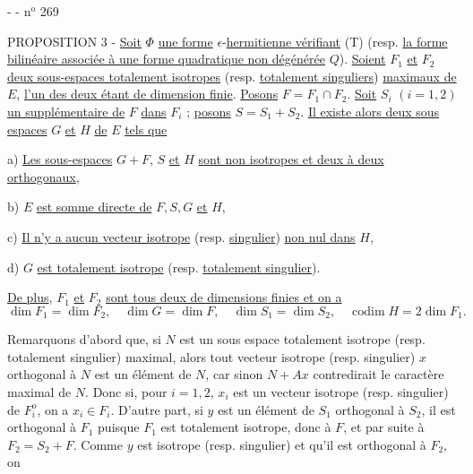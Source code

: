 -  - \hfill n$^{\mathrm{o}}$ 269

PROPOSITION 3 - \uline{Soit} $\Phi$ \uline{une forme} $\epsilon$-\uline{hermitienne vérifiant} (T) (resp. \uline{la forme bilinéaire associée à une forme quadratique non dégénérée} $Q$). \uline{Soient} $F_1$ \uline{et} $F_2$ \uline{deux sous-espaces totalement isotropes} (resp. \uline{totalement singuliers}) \uline{maximaux de} $E$, \uline{l'un des deux étant de dimension finie}. \uline{Posons} $F=F_1\cap F_2$. \uline{Soit} $S_i$ $(i=1,2)$ \uline{un supplémentaire de} $F$ \uline{dans} $F_i$ ; \uline{posons} $S=S_1+S_2$. \uline{Il existe alors deux sous espaces} $G$ \uline{et} $H$ \uline{de} $E$ \uline{tels que}

a) \uline{Les sous-espaces} $G+F$, $S$ \uline{et} $H$ \uline{sont non isotropes et deux à deux orthogonaux},

b) $E$ \uline{est somme directe de} $F,S,G$ \uline{et} $H$,

c) \uline{Il n'y a aucun vecteur isotrope} (resp. \uline{singulier}) \uline{non nul dans} $H$,

d) $G$ \uline{est totalement isotrope} (resp. \uline{totalement singulier}).

\uline{De plus}, $F_1$ \uline{et} $F_2$ \uline{sont tous deux de dimensions finies et on a}
\[
\dim F_1=\dim F_2,\quad\dim G=\dim F,\quad\dim S_1=\dim S_2,\quad\operatorname{codim}H=2\dim F_1.
\]

Remarquons d'abord que, si $N$ est un sous espace totalement isotrope (resp. totalement singulier) maximal, alors tout vecteur isotrope (resp. singulier) $x$ orthogonal à $N$ est un élément de $N$, car sinon $N+Ax$ contredirait le caractère maximal de $N$.
Donc si, pour $i=1,2$, $x_i$ est un vecteur isotrope (resp. singulier) de $F_i^{\mathrm o}$, on a $x_i\in F_i$. D'autre part, si $y$ est un élément de $S_1$ orthogonal à $S_2$, il est orthogonal à $F_1$ puisque $F_1$ est totalement isotrope, donc à $F$, et par suite à $F_2=S_2+F$. Comme $y$ est isotrope (resp. singulier) et qu'il est orthogonal à $F_2$, on
